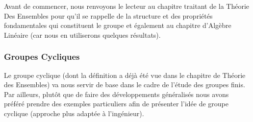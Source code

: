 	Avant de commencer, nous renvoyons le lecteur au chapitre traitant de la Théorie Des Ensembles pour qu'il se rappelle de la structure et des propriétés fondamentales qui constituent le groupe et également au chapitre d'Algèbre Linéaire (car nous en utiliserons quelques résultats).
	
	\subsubsection{Groupes Cycliques}\label{cyclic groups}
	Le groupe cyclique (dont la définition a déjà été vue dans le chapitre de Théorie des Ensembles) va nous servir de base dans le cadre de l'étude des groupes finis. Par ailleurs, plutôt que de faire des développements généralisés nous avons préféré prendre des exemples particuliers afin de présenter l'idée de groupe cyclique (approche plus adaptée à l'ingénieur).

